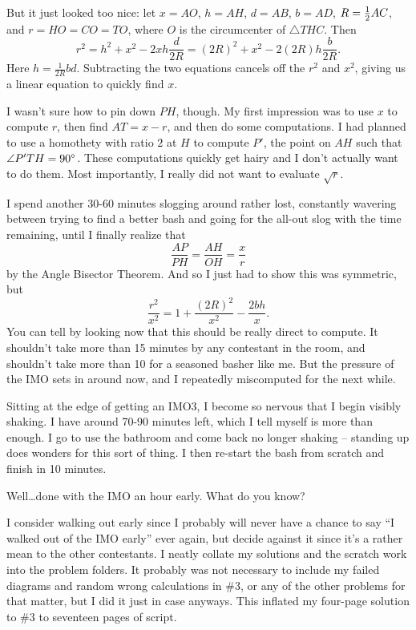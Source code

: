 \documentclass[11pt]{scrreprt}
\numberwithin{figure}{chapter}
\begin{document}
But it just looked too nice: let $x=AO$, $h = AH$, $d=AB$, $b=AD$, $R = \frac{1}{2} AC$, and $r=HO=CO=TO$, where $O$ is the circumcenter of $\triangle THC$.  Then
\[ r^2 = h^2 + x^2 - 2xh \frac{d}{2R}
  = (2R)^2 + x^2 - 2(2R)h \frac{b}{2R}. \]
Here $h = \frac{1}{2R} bd$. Subtracting the two equations cancels off the $r^2$ and $x^2$, giving us a linear equation to quickly find $x$.

I wasn't sure how to pin down $PH$, though. My first impression was to use $x$ to compute $r$, then find $AT = x-r$, and then do some computations. I had planned to use a homothety with ratio $2$ at $H$ to compute $P'$, the point on $AH$ such that $\angle P'TH = 90^\circ$.
These computations quickly get hairy and I don't actually want to do them.
Most importantly, I really did not want to evaluate $\sqrt r$.

I spend another 30-60 minutes slogging around rather lost, constantly wavering between trying to find a better bash and going for the all-out slog with the time remaining,  until I finally realize that
\[ \frac{AP}{PH} = \frac{AH}{OH} = \frac{x}{r} \]
by the Angle Bisector Theorem. And so I just had to show this was symmetric, but
\[ \frac{r^2}{x^2} = 1 + \frac{(2R)^2}{x^2} - \frac{2bh}{x}. \]
You can tell by looking now that this should be really direct to compute. It shouldn't take more than 15 minutes by any contestant in the room, and shouldn't take more than 10 for a seasoned basher like me.
But the pressure of the IMO sets in around now, and I repeatedly miscomputed for the next while.

Sitting at the edge of getting an IMO3, I become so nervous that I begin visibly shaking.
I have around 70-90 minutes left, which I tell myself is more than enough.
I go to use the bathroom and come back no longer shaking -- standing up does wonders for this sort of thing.
I then re-start the bash from scratch and finish in 10 minutes.

Well\dots done with the IMO an hour early. What do you know?

I consider walking out early since I probably will never have a chance to say ``I walked out of the IMO early'' ever again, but decide against it since it's a rather mean to the other contestants.
I neatly collate my solutions and the scratch work into the problem folders. It probably was not necessary to include my failed diagrams and random wrong calculations in \#3, or any of the other problems for that matter, but I did it just in case anyways.
This inflated my four-page solution to \#3 to seventeen pages of script.
\end{document}
